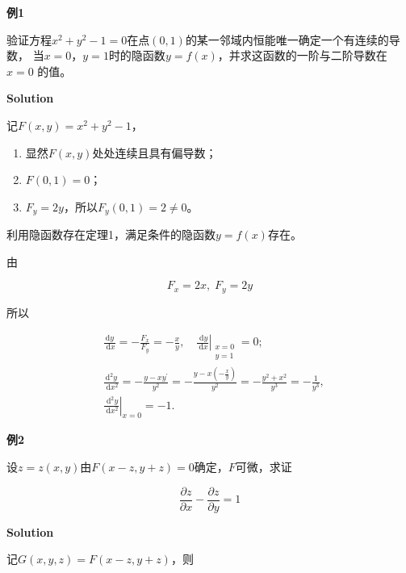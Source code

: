 \documentclass[12pt, a4paper]{article}
\numberwithin{equation}{section}
\newcommand{\pderiv}[2]{\frac{\partial #1}{\partial #2}}
\begin{document}
    \textbf{例1}
    \vspace{1em}

    验证方程\(x^2+y^2-1=0\)在点\(\left(0,1\right)\)的某一邻域内恒能唯一确定一个有连续的导数，
    当\(x=0\)，\(y=1\)时的隐函数\(y=f\left(x\right)\)，并求这函数的一阶与二阶导数在\(x=0\)
    的值。
    \vspace{1em}

    \textbf{Solution}
    \vspace{1em}

    记\(F\left(x,y\right)=x^2+y^2-1\)，

    \begin{enumerate}
        \item 显然\(F\left(x,y\right)\)处处连续且具有偏导数；
        \item \(F\left(0,1\right)=0\)；
        \item \(F_y=2y\)，所以\(F_y\left(0,1\right)=2\neq0\)。
    \end{enumerate}

    利用隐函数存在定理1，满足条件的隐函数\(y=f\left(x\right)\)存在。

    由

    $$
        F_x=2x,\; F_y = 2y
    $$

    所以

    $$
        \begin{aligned}
            &\frac{\mathrm{d} y}{\mathrm{~d} x}=-\frac{F_x}{F_y}=-\frac{x}{y},\left.\quad
                \frac{\mathrm{~d} y}{\mathrm{~d} x}\right|_{\substack{x=0 \\ y=1}}=0; \\
            & \frac{\mathrm{d}^2 y}{\mathrm{~d} x^2}=-\frac{y-x y^{\prime}}{y^2}=-\frac{y-x\left(-\frac{x}{y}\right)}{y^2}
                =-\frac{y^2+x^2}{y^3}=-\frac{1}{y^3}, \\
            & \left.\frac{\mathrm{~d}^2 y}{\mathrm{~d} x^2}\right|_{x=0}=-1 .
        \end{aligned}
    $$

    \textbf{例2}
    \vspace{1em}

    设\(z=z\left(x,y\right)\)由\(F\left(x-z,y+z\right)=0\)确定，\(F\)可微，求证

    \[
        \pderiv{z}{x} - \pderiv{z}{y} = 1
    \]
    \vspace{1em}

    \textbf{Solution}
    \vspace{1em}

    记\(G\left(x,y,z\right)=F\left(x-z,y+z\right)\)，则
\end{document}
